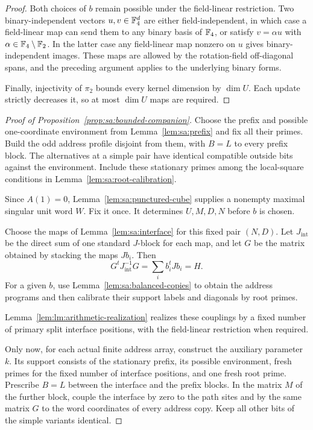 \begin{proof}
Both choices of $b$ remain possible under the field-linear restriction.
Two binary-independent vectors $u,v\in\mathbb F_4^d$ are either
field-independent, in which case a field-linear map can send them to
any binary basis of $\mathbb F_4$, or satisfy $v=\alpha u$ with
$\alpha\in\mathbb F_4\setminus\mathbb F_2$.  In the latter case any field-linear
map nonzero on $u$ gives binary-independent images.  These maps are
allowed by the rotation-field off-diagonal spans, and the preceding
argument applies to the underlying binary forms.

Finally, injectivity of $\pi_2$ bounds every kernel dimension by
$\dim U$.  Each update strictly decreases it, so at most $\dim U$
maps are required.
\end{proof}

\begin{proof}[Proof of Proposition~\ref{prop:sa:bounded-companion}]
Choose the prefix and possible one-coordinate environment from
Lemma~\ref{lem:sa:prefix} and fix all their primes. Build the odd
address profile disjoint from them, with $B=L$ to every prefix block.
The alternatives at a simple pair have identical compatible outside
bits against the environment. Include these stationary primes among
the local-square conditions in Lemma~\ref{lem:sa:root-calibration}.

Since $A(1)=0$, Lemma~\ref{lem:sa:punctured-cube} supplies a nonempty
maximal singular unit word $W$. Fix it once. It determines $U,M,D,N$
before $b$ is chosen.

Choose the maps of Lemma~\ref{lem:sa:interface} for this fixed pair
$(N,D)$.  Let $J_{\mathrm{int}}$ be the direct sum of one standard
$J$-block for each map, and let $G$ be the matrix obtained by stacking
the maps $Jb_i$.  Then
\[
 G^tJ_{\mathrm{int}}^{-1}G=\sum_i b_i^tJb_i=H.
\]
For a given $b$, use
Lemma~\ref{lem:sa:balanced-copies} to obtain the address programs and
then calibrate their support labels and diagonals by root primes.

Lemma~\ref{lem:lm:arithmetic-realization} realizes these couplings by
a fixed number of primary split interface positions, with the
field-linear restriction when required.

Only now, for each actual finite address array, construct the auxiliary
parameter $k$.  Its support consists of the stationary prefix, its
possible environment, fresh primes for the fixed number of interface
positions, and one fresh root prime.  Prescribe $B=L$ between the
interface and the prefix blocks.  In the matrix $M$ of the further
block, couple the interface by zero to the path sites and by the same
matrix $G$ to the word coordinates of every address copy.  Keep all
other bits of the simple variants identical.


\end{proof}
